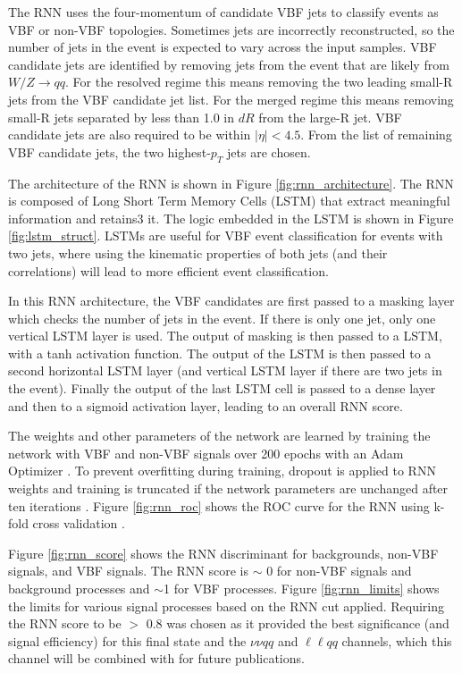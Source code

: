 The RNN uses the four-momentum of candidate VBF jets to classify events as VBF or non-VBF topologies. Sometimes jets are incorrectly reconstructed, so the number of jets in the event is expected to vary across the input samples. VBF candidate jets are identified by removing jets from the event that are likely from $W/Z \rightarrow qq$. For the resolved regime this means removing the two leading small-R jets from the VBF candidate jet list. For the merged regime this means removing small-R jets separated by less than 1.0 in $dR$ from the large-R jet. VBF candidate jets are also required to be within $|\eta| < 4.5$. From the list of remaining VBF candidate jets, the two highest-$p_{T}$ jets are chosen. 

The architecture of the RNN is shown in Figure \ref{fig:rnn_architecture}. The RNN is composed of Long Short Term Memory Cells (LSTM) that extract meaningful information and retains3 it. The logic embedded in the LSTM is shown in Figure \ref{fig:lstm_struct}. LSTMs are useful for VBF event classification for events with two jets, where using the kinematic properties of both jets (and their correlations) will lead to more efficient event classification.

In this RNN architecture, the VBF candidates are first passed to a masking layer which checks the number of jets in the event. If there is only one jet, only one vertical LSTM layer is used. The output of masking is then passed to a LSTM, with a tanh activation function. The output of the LSTM is then passed to a second horizontal LSTM layer (and vertical LSTM layer if there are two jets in the event). Finally the output of the last LSTM cell is passed to a dense layer and then to a sigmoid activation layer, leading to an overall RNN score.

The weights and other parameters of the network are learned by training the network with VBF and non-VBF signals over 200 epochs with an Adam Optimizer \cite{adamopt}. To prevent overfitting during training, dropout is applied to RNN weights and training is truncated if the network parameters are unchanged after ten iterations \cite{rnndropout}. Figure \ref{fig:rnn_roc} shows the ROC curve for the RNN using k-fold cross validation \cite{kfold}. 

 Figure \ref{fig:rnn_score} shows the RNN discriminant for backgrounds, non-VBF signals, and VBF signals. The RNN score is $\sim$ 0 for non-VBF signals and background processes and $\sim$1 for VBF processes. Figure \ref{fig:rnn_limits} shows the limits for various signal processes based on the RNN cut applied. Requiring the RNN score to be $>$ 0.8 was chosen as it provided the best significance (and signal efficiency) for this final state and the $\nu\nu qq$ and $\ell \ell qq$ channels, which this channel will be combined with for future publications.


